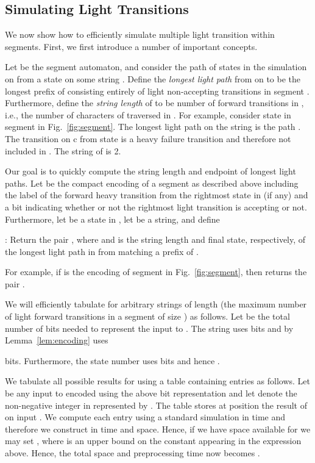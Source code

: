 \documentclass{article}
\begin{document}
\subsection{Simulating Light Transitions}
We now show how to efficiently simulate multiple light transition within
segments. First, we first introduce a number of important concepts. 


Let  be the segment automaton, and consider the path 
of states in the simulation on  from a state  on some string
. Define the \emph{longest light path} from  on  to be
the longest prefix of  consisting entirely of light non-accepting
transitions in segment . Furthermore, define the \emph{string
  length} of  to be number of forward transitions in , i.e., the
number of characters of  traversed in . For example, consider
state  in segment  in Fig.~\ref{fig:segment}. The longest
light path on the string  is the path . The transition on c from state  is a
heavy failure transition and therefore not included in . The string
of  is 2.



Our goal is to quickly compute the string length and endpoint of
longest light paths. Let  be the compact encoding of a
segment  as described above including the label of the forward
heavy transition from the rightmost state in  (if any) and a bit
indicating whether or not the rightmost light transition is accepting
or not. Furthermore, let  be a state in , let  be a string,
and define
\begin{relate}
\item[:] Return the pair , where 
  and  is the string length and final state, respectively, of the longest
  light path in  from  matching a prefix of .
\end{relate}
For example, if  is the encoding of segment 
in Fig.~\ref{fig:segment}, then 
returns the pair . 


We will efficiently tabulate  for arbitrary strings  of
length  (the maximum number of light forward transitions in a
segment of size ) as follows. Let  be the total number of bits
needed to represent the input to . The string  uses  bits and by Lemma~\ref{lem:encoding}  uses

bits. Furthermore, the state number  uses  bits and
hence . 

We tabulate all possible results for  using a table 
containing  entries as follows. Let  be any input to 
encoded using the above  bit representation and let 
denote the non-negative integer in  represented by
. The table stores at position  the result of
 on input . We compute each entry using a standard
simulation in  time and therefore we construct  in  time and space. Hence, if we have  space
available for  we may set , where  is an upper bound on the constant
appearing in the  expression above. Hence, the total space
and preprocessing time now becomes .
\end{document}
